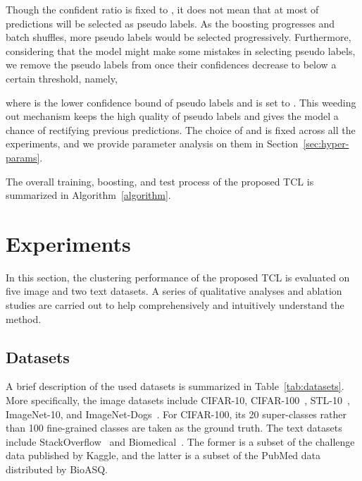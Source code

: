 Though the confident ratio is fixed to , it does not mean that at most  of predictions will be selected as pseudo labels. As the boosting progresses and batch shuffles, more pseudo labels would be selected progressively. Furthermore, considering that the model might make some mistakes in selecting pseudo labels, we remove the pseudo labels from  once their confidences decrease to below a certain threshold, namely, 

where  is the lower confidence bound of pseudo labels and is set to . This weeding out mechanism keeps the high quality of pseudo labels and gives the model a chance of rectifying previous predictions. The choice of  and  is fixed across all the experiments, and we provide parameter analysis on them in Section~\ref{sec:hyper-params}.

The overall training, boosting, and test process of the proposed TCL is summarized in Algorithm~\ref{algorithm}.

\section{Experiments}

In this section, the clustering performance of the proposed TCL is evaluated on five image and two text datasets. A series of qualitative analyses and ablation studies are carried out to help comprehensively and intuitively understand the method.

\subsection{Datasets}

A brief description of the used datasets is summarized in Table~\ref{tab:datasets}. More specifically, the image datasets include CIFAR-10, CIFAR-100~\citep{CIFAR}, STL-10~\citep{STL}, ImageNet-10, and ImageNet-Dogs~\citep{ImageNet10/dogs}. For CIFAR-100,  its 20 super-classes rather than 100 fine-grained classes are taken as the ground truth. The text datasets include StackOverflow~\citep{TextData} and Biomedical~\citep{TextData}. The former is a subset of the challenge data published by Kaggle, and the latter is a subset of the PubMed data distributed by BioASQ.

